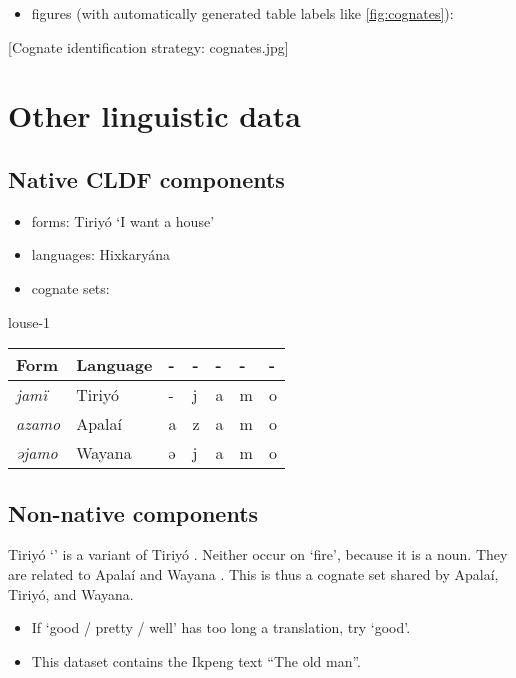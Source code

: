 \documentclass{article}
\begin{document}
\begin{itemize}
\tightlist
\item
  figures (with automatically generated table labels like
  \cref{fig:cognates}):
\end{itemize}

{[}Cognate identification strategy: cognates.jpg{]}

\section{\texorpdfstring{Other linguistic data
\label{sec:data}}{Other linguistic data }}

\subsection{Native CLDF components}

\begin{itemize}
\tightlist
\item
  forms: Tiriyó  `I want a house'
\item
  languages: Hixkaryána
\item
  cognate sets:
\end{itemize}

louse-1

\begin{longtable}[]{@{}lllllll@{}}
\toprule()
Form & Language & - & - & - & - & - \\
\midrule()
\endhead
\emph{jamï} & Tiriyó & - & j & a & m & o \\
\emph{azamo} & Apalaí & a & z & a & m & o \\
\emph{əjamo} & Wayana & ə & j & a & m & o \\
\bottomrule()
\end{longtable}

\subsection{Non-native components}

Tiriyó  `' is a variant of Tiriyó . Neither
occur on  `fire', because it is a noun. They are related to
Apalaí  and Wayana . This is thus a cognate set
shared by Apalaí, Tiriyó, and Wayana.

\begin{itemize}
\item
  If  `good / pretty / well' has too long a translation, try
   `good'.
\item
  This dataset contains the Ikpeng text ``The old man''.
\end{itemize}
\end{document}
